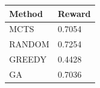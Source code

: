 \begin{tabular}{ll}
\hline
Method & Reward \\
\hline
  MCTS & 0.7054 \\
  RANDOM & 0.7254 \\
  GREEDY & 0.4428 \\
  GA & 0.7036 \\
\hline
\end{tabular}
